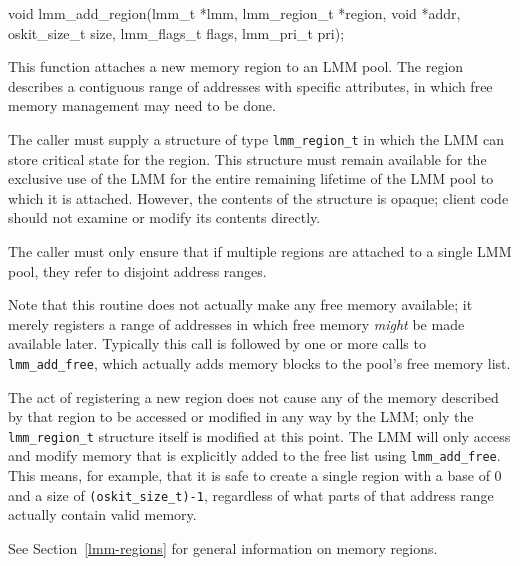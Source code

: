 \label{lmm-add-region}
\begin{apisyn}

	\funcproto void lmm_add_region(lmm_t *lmm, lmm_region_t *region,
					void *addr, oskit_size_t size,
					lmm_flags_t flags, lmm_pri_t pri);
\end{apisyn}
\begin{apidesc}
	This function attaches a new memory region to an LMM pool.
	The region describes a contiguous range of addresses
	with specific attributes,
	in which free memory management may need to be done.

	The caller must supply a structure of type {\tt lmm_region_t}
	in which the LMM can store critical state for the region.
	This structure must remain available for the exclusive use of the LMM
	for the entire remaining lifetime of the LMM pool
	to which it is attached.
	However, the contents of the structure is opaque;
	client code should not examine or modify its contents directly.

	The caller must only ensure
	that if multiple regions are attached to a single LMM pool,
	they refer to disjoint address ranges.

	Note that this routine does not actually make any free memory available;
	it merely registers a range of addresses
	in which free memory \emph{might} be made available later.
	Typically this call is followed
	by one or more calls to {\tt lmm_add_free},
	which actually adds memory blocks to the pool's free memory list.

	The act of registering a new region
	does not cause any of the memory described by that region
	to be accessed or modified in any way by the LMM;
	only the {\tt lmm_region_t} structure itself is modified at this point.
	The LMM will only access and modify memory
	that is explicitly added to the free list using {\tt lmm_add_free}.
	This means, for example,
	that it is safe to create a single region with a base of 0
	and a size of {\tt (oskit_size_t)-1},
	regardless of what parts of that address range
	actually contain valid memory.

	See Section~\ref{lmm-regions} for general information on memory regions.
\end{apidesc}
